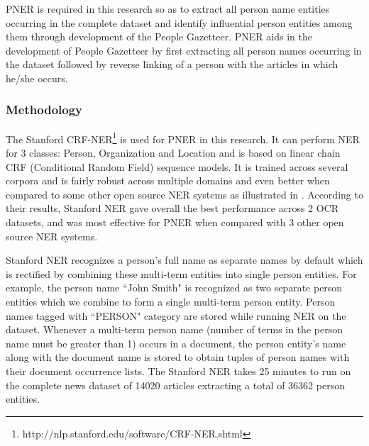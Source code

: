 \documentclass[10pt,journal,compsoc]{IEEEtran}
\begin{document}
PNER is required in this research so as to extract all person name entities occurring in the complete dataset and identify influential person entities among them through development of the People Gazetteer. 
PNER aids in the development of People Gazetteer by first extracting all person names occurring in the dataset followed by reverse linking of a person with the articles in which he/she occurs.

\subsubsection{Methodology}

The Stanford CRF-NER\footnote{http://nlp.stanford.edu/software/CRF-NER.shtml} is used for PNER in this research. It can perform NER for 3 classes: Person, Organization and Location and is based on linear chain CRF (Conditional Random Field) sequence models. It is trained across several corpora and is fairly robust across multiple domains and even better when compared to some other open source NER systems as illustrated in \cite{rodriquez2012comparison}. According to their results, Stanford NER gave overall the best performance across 2 OCR datasets, and was most effective for PNER when compared with 3 other open source NER systems.





 Stanford NER recognizes a person's full name as separate names by default which is rectified by combining these multi-term entities into single person entities. For example, the person name ``John Smith" is recognized as two separate person entities which we combine to form a single multi-term person entity.
Person names tagged with ``PERSON" category are stored while running NER on the dataset.
Whenever a multi-term person name (number of terms in the person name must be greater than 1) occurs in a document, the person entity's name along with the document name is stored to obtain tuples of person names with their document occurrence lists.
The Stanford NER takes 25 minutes to run on the complete news dataset of 14020 articles extracting a total of 36362 person entities.  
\end{document}
